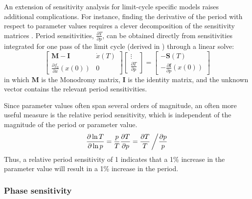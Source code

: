 An extension of sensitivity analysis for limit-cycle specific models raises additional complications. 
For instance, finding the derivative of the period with respect to parameter values requires a clever decomposition of the sensitivity matrices \cite{Kramer1984}. 
Period sensitivities, $\frac{\partial T}{\partial p}$, can be obtained directly from sensitivities integrated for one pass of the limit cycle (derived in \cite{Wilkins2009}) through a linear solve:
\begin{equation}
  \left[\begin{array}{cc}
      \mathbf{M} - \mathbf{I} & \dot{x}(T) \\
      \frac{\partial f_0}{\partial x}(x(0)) & 0
  \end{array}\right]
  \left[\begin{array}{c}
      \vdots \\ \frac{\partial T}{\partial p}
  \end{array}\right] =
  \left[\begin{array}{c}
      -\mathbf{S}(T) \\ -\frac{\partial {\bm f}}{\partial p}(x(0))
  \end{array}\right]
\end{equation}
in which $\mathbf{M}$ is the Monodromy matrix, $\mathbf{I}$ is the identity matrix, and the unknown vector contains the relevant period sensitivities.

Since parameter values often span several orders of magnitude, an often more useful measure is the relative period sensitivity, which is independent of the magnitude of the period or parameter value.
\begin{equation}
  \frac{\partial \ln T}{\partial \ln p} = \frac{p}{T}\frac{\partial T}{\partial p} = \frac{\partial T}{T} \left/ \frac{\partial p}{p} \right.\label{eq:relperiodsens}
\end{equation}
Thus, a relative period sensitivity of 1 indicates that a 1\% increase in the parameter value will result in a 1\% increase in the period.

\subsubsection{Phase sensitivity}

